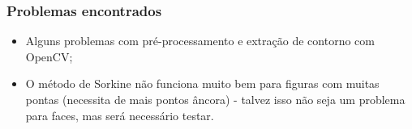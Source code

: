 \begin{frame}
	\frametitle{Problemas encontrados}
	
	\begin{itemize}
		\item Alguns problemas com pré-processamento e extração de contorno com OpenCV;
		\item O método de Sorkine não funciona muito bem para figuras com muitas pontas (necessita de mais pontos âncora) - talvez isso não seja um problema para faces, mas será necessário testar.
	\end{itemize}
	
\end{frame}


